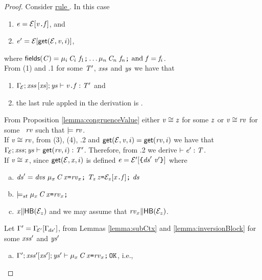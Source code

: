 {\begin{proof}
\medskip\noindent
Consider \underline{rule }.
In this case  
\begin{enumerate} [(1)]
\item $\mathit{e}={\cal{E}}[{\mathit{v}}\texttt{.}\mathit{f}]$, and 
\item $\mathit{e}'={{\cal{E}}[\textsf{get}({\cal{E}},\mathit{v},i)]}$, 
\end{enumerate}
where 
$\fields{\C}=\Field{\Type{\mu_i}{\C_i}}{\f_1}\ldots\Field{\Type{\mu_n}{\C_n}}{\f_n}\ \mbox{and}\  \f=\f_i$.\\
From (1) and  .1 for some $\mathit{T}'$, $\mathit{xss}$ and $\mathit{ys}$ we have that
\begin{enumerate}[(1)]\addtocounter{enumi}{2}
  \item ${\Gamma_{\!{\cal{E}}}};\mathit{xss}\,[\mathit{xs}];\mathit{ys}\vdash {\mathit{v}}\texttt{.}\mathit{f}:\mathit{T}'$ and
  \item the last rule appled in the derivation is .
\end{enumerate} 
From Proposition \ref{lemma:congruenceValue} either $\mathit{v}\cong\mathit{z}$ for some $\mathit{z}$ or  $\mathit{v}\cong\mathit{rv}$ for some 
\storableVal\  $\mathit{rv}$ such that $\models\mathit{rv}$. \\
If \underline{$\mathit{v}\cong\mathit{rv}$}, from (3), (4), .2 and  $\textsf{get}({\cal{E}},\mathit{v},i)=\textsf{get}(\mathit{rv},i)$ we have that 
${\Gamma_{\!{\cal{E}}}};\mathit{xss};\mathit{ys}\vdash \textsf{get}(\mathit{rv},i):\mathit{T}'$. Therefore,
from .2 we derive $\vdash \mathit{e}':\mathit{T}$.\\
If \underline{$\mathit{v}\cong\mathit{x}$}, since $\textsf{get}({\cal{E}},\mathit{x},i)$ is defined $\mathit{e}={\cal{E}'}[\texttt{\{}\mathit{ds}'\ \mathit{v}'\texttt{\}}]$ where 
\begin{enumerate}[(a)]
  \item $\decs'=\dvs\ \Dec{\Type{\mu_x}{\C}}{\x}{\stVal_x}\ \Dec{\T_z}{\z}{\ctx_z[\FieldAccess{{\x}}{\f}]}\ \decs$
  \item $\models_{st}\mu_x\,\mathit{C}\,\mathit{x}\texttt{=}\mathit{rv}_x\texttt{;}$
  \item $\mathit{x}{\parallel}\textsf{HB}({\cal{E}}_z)$ and we may assume that $\mathit{rv}_x{\parallel}\textsf{HB}({\cal{E}}_z)$.
\end{enumerate}
Let $\Gamma'=\Gamma_{\!{\cal{E}'}}[\Gamma_{\!\mathit{ds}'}]$, from Lemmas \ref{lemma:subCtx} and \ref{lemma:inversionBlock} for some $\mathit{xss}'$ and $\mathit{ys}'$ 
\begin{enumerate} [(a)]\addtocounter{enumi}{3}
\item $\Gamma';\mathit{xss}'[\mathit{xs}'];\mathit{ys}'\vdash \mu_x\,\mathit{C}\,\mathit{x}\texttt{=}\mathit{rv}_x\texttt{;}\,{\tt OK}$, i.e., 

\end{enumerate}
\end{proof}}
